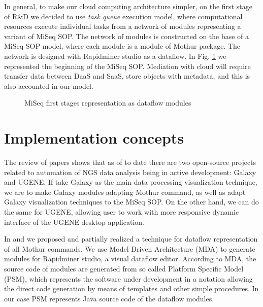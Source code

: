 \documentclass[a4paper]{jpconf}
\begin{document}
In general, to make our cloud computing architecture simpler, on the first stage of R\&D we decided to use \emph{task queue} execution model, where computational resources execute individual tasks from a network of modules representing a variant of MiSeq SOP.  The network of modules is constructed on the base of a MiSeq SOP model, where each module is a module of Mothur package.  The network is designed with Rapidminer studio as a dataflow. In Fig. \ref{fig:mothur} we represented the beginning of the MiSeq SOP.  Mediation with cloud will require transfer data between DaaS and SaaS, store objects with metadata, and this is also accounted in our model.



\begin{figure}[bt]
  \centering
  \caption{MiSeq first stages representation as dataflow modules \cite{cherk19}}
  \label{fig:mothur}
\end{figure}


\section{Implementation concepts}

The review of papers shows that as of to date there are two open-source projects related to automation of NGS data analysis being in active development: Galaxy and UGENE.  If take Galaxy as the main data processing visualization technique, we are to make Galaxy modules adapting Mothur command, as well as adapt Galaxy visualization techniques to the MiSeq SOP.  On the other hand, we can do the same for UGENE, allowing user to work with more responsive dynamic interface of the UGENE desktop application.

In \cite{cherk19} and \cite{zont19} we proposed and partially realized a technique for dataflow representation of all Mothur commands.  We use Model Driven Architecture (MDA) to generate modules for Rapidminer studio, a visual dataflow editor.  According to MDA, the source code of modules are generated from so called Platform Specific Model (PSM), which represents the software under development in a notation allowing the direct code generation by means of templates and other simple procedures.  In our case PSM represents Java source code of the dataflow modules.
\end{document}
